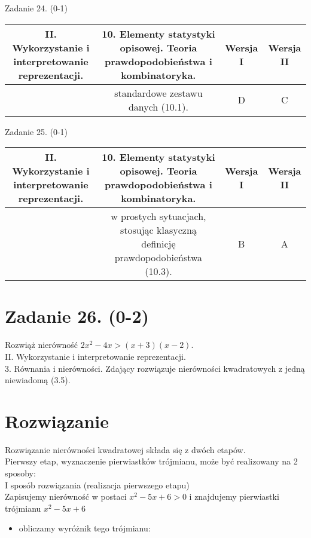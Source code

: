 \documentclass[10pt]{article}
\begin{document}
Zadanie 24. (0-1)

\begin{center}
\begin{tabular}{|c|c|c|c|}
\hline
\multirow[t]{2}{*}{II. Wykorzystanie i interpretowanie reprezentacji.} & 10. Elementy statystyki opisowej. Teoria prawdopodobieństwa i kombinatoryka. & Wersja I & Wersja II \\
\hline
 & standardowe zestawu danych (10.1). & D & C \\
\hline
\end{tabular}
\end{center}

Zadanie 25. (0-1)

\begin{center}
\begin{tabular}{|c|c|c|c|}
\hline
\multirow[t]{2}{*}{II. Wykorzystanie i interpretowanie reprezentacji.} & 10. Elementy statystyki opisowej. Teoria prawdopodobieństwa i kombinatoryka. & Wersja I & Wersja II \\
\hline
 & w prostych sytuacjach, stosując klasyczną definicję prawdopodobieństwa (10.3). & B & A \\
\hline
\end{tabular}
\end{center}

\section*{Zadanie 26. (0-2)}
Rozwiąż nierówność $2 x^{2}-4 x>(x+3)(x-2)$.\\
II. Wykorzystanie i interpretowanie reprezentacji.\\
3. Równania i nierówności. Zdający rozwiązuje nierówności kwadratowych z jedną niewiadomą (3.5).

\section*{Rozwiązanie}
Rozwiązanie nierówności kwadratowej składa się z dwóch etapów.\\
Pierwszy etap, wyznaczenie pierwiastków trójmianu, może być realizowany na 2 sposoby:\\
I sposób rozwiązania (realizacja pierwszego etapu)\\
Zapisujemy nierówność w postaci $x^{2}-5 x+6>0$ i znajdujemy pierwiastki trójmianu $x^{2}-5 x+6$

\begin{itemize}
  \item obliczamy wyróżnik tego trójmianu:
\end{itemize}
\end{document}
